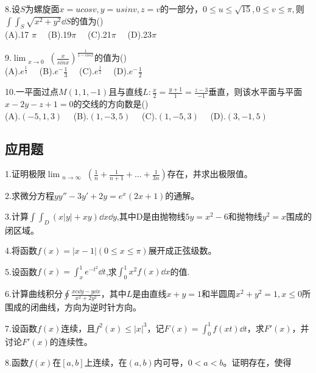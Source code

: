 8.设$S$为螺旋面$x=ucosv,y=usinv,z=v$的一部分，$0\leqslant u \leqslant \sqrt{15},0 \leqslant v \leqslant \pi,$则$\int \int_{S} \sqrt{x^2+y^2} \dd{S}$的值为()\\
(A).17 $\pi \quad$ (B).19$ \pi \quad$ (C).21$ \pi \quad$  (D).23$ \pi \quad$

9.$\displaystyle \lim_{\substack{x \to 0}} (\frac{x}{sinx})^{\frac{1}{1-cosx}}$的值为()\\
(A).$e^\frac{1}{3}\quad$     (B).$e^-\frac{1}{3}\quad$    (C).$e^\frac{1}{2}\quad$      (D).$e^-\frac{1}{2}\quad$

10.一平面过点$M(1,1,-1)$且与直线$L:\frac{x}{2}=\frac{y+1}{1}=\frac{z-3}{-1}$垂直，则该水平面与平面$x-2y-z+1=0$的交线的方向数是()\\
(A).$(-5,1,3)\quad$  (B).$(1,-3,5)\quad$  (C).$(1,-5,3)\quad$   (D).$(3,-1,5)\quad$

\subsection{应用题}
1.证明极限$\displaystyle \lim_{\substack {n \to \infty}}(\frac{1}{n}+\frac{1}{n+1}+ \dots +\frac{1}{3n})$存在，并求出极限值。

2.求微分方程$yy''-3y'+2y=e^x(2x+1)$的通解。

3.计算$\int \int_{D}(x|y|+xy)\dd{x}\dd{y}$,其中D是由抛物线$5y=x^2-6$和抛物线$y^2=x$围成的闭区域。

4.将函数$f(x)=|x-1| (0\leqslant x \leqslant \pi)$展开成正弦级数。

5.设函数$f(x)=\int_{x}^{1}e^{-t^2}\dd{t}$,求$\int_{0}^{1}x^2f(x)\dd{x}$的值.

6.计算曲线积分$\oint \frac{xc\dd{y}-y\dd{x}}{x^2+2y^2}$，其中$L$是由直线$x+y=1$和半圆周$x^2+y^2=1,x \leqslant 0$所围成的闭曲线，方向为逆时针方向。

7.设函数$f(x)$连续，且$f^2(x) \leqslant {|x|}^3$，记$F(x)=\int_{0}^{1}f(xt)\dd{t}$，求$F'(x)$，并讨论$F'(x)$的连续性。

8.函数$f(x)$在$[a,b]$上连续，在$(a,b)$内可导，$0<a<b$。证明存在\ke，使得